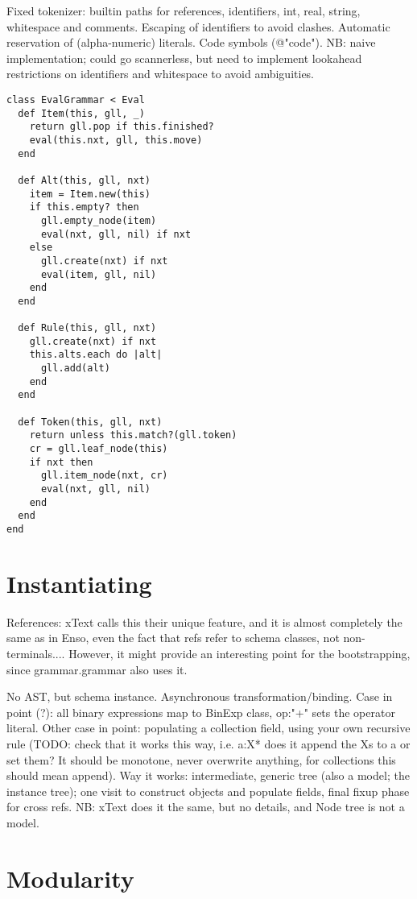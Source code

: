 \documentclass[a4paper]{article}
\begin{document}
Fixed tokenizer: builtin paths for references, identifiers, int, real,
string, whitespace and comments. Escaping of identifiers to avoid
clashes. Automatic reservation of (alpha-numeric) literals. Code
symbols (@"code"). NB: naive implementation; could go scannerless, but
need to implement lookahead restrictions on identifiers and whitespace
to avoid ambiguities.

\begin{verbatim}
class EvalGrammar < Eval
  def Item(this, gll, _)
    return gll.pop if this.finished?
    eval(this.nxt, gll, this.move)
  end

  def Alt(this, gll, nxt)
    item = Item.new(this)
    if this.empty? then
      gll.empty_node(item)
      eval(nxt, gll, nil) if nxt
    else
      gll.create(nxt) if nxt
      eval(item, gll, nil)
    end
  end
  
  def Rule(this, gll, nxt)
    gll.create(nxt) if nxt
    this.alts.each do |alt|
      gll.add(alt)
    end
  end

  def Token(this, gll, nxt)
    return unless this.match?(gll.token)
    cr = gll.leaf_node(this)
    if nxt then
      gll.item_node(nxt, cr)
      eval(nxt, gll, nil)
    end
  end
end
\end{verbatim}


\section{Instantiating}

References: xText calls this their unique feature, and it is almost
completely the same as in Enso, even the fact that refs refer to
schema classes, not non-terminals.... However, it might provide an
interesting point for the bootstrapping, since grammar.grammar also
uses it.

No AST, but schema instance. Asynchronous transformation/binding. Case
in point (?): all binary expressions map to BinExp class, op:"+" sets
the operator literal. Other case in point: populating a collection
field, using your own recursive rule (TODO: check that it works this
way, i.e. a:X* does it append the Xs to a or set them? It should be
monotone, never overwrite anything, for collections this should mean
append). Way it works: intermediate, generic tree (also a model; the
instance tree); one visit to construct objects and populate fields,
final fixup phase for cross refs. NB: xText does it the same, but no
details, and Node tree is not a model.

\section{Modularity}
\end{document}
